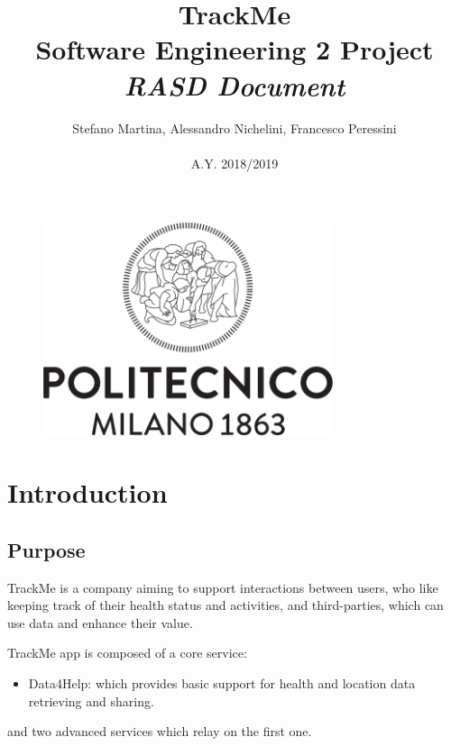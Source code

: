 \documentclass{article}
\begin{document}
\begin{figure}[t]
\centering
	\includegraphics[height=6.25cm,keepaspectratio]{Figures/logo}
\end{figure}

\title{TrackMe \\ Software Engineering 2 Project\\ \textit{RASD Document} }
\author{Stefano Martina, Alessandro Nichelini, Francesco Peressini
		\\ \\ A.Y. 2018/2019}
		
\maketitle
\newpage

\tableofcontents
\newpage

\section{Introduction}

\subsection{Purpose} 

TrackMe is a company aiming to support interactions between users, 
who like keeping track of their health status and activities, and
third-parties, which can use data and enhance their value.


TrackMe app is composed of a core service: 
\begin{itemize}
\item Data4Help: which provides basic support for health and location data retrieving and sharing.
\end{itemize}

and two advanced services which relay on the first one.
\end{document}
